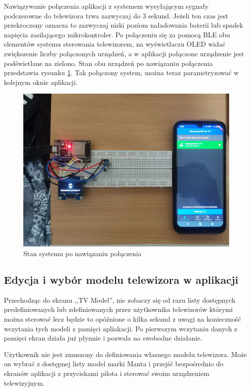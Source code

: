 \documentclass[12pt,twoside]{article}
\begin{document}
Nawiązywanie połączenia aplikacji z systemem wysyłającym sygnały podczerowne do telewizora trwa zazwyczaj do 3 sekund. Jeżeli ten czas jest przekroczony oznacza to zazwyczaj niski poziom naładowania baterii lub spadek napięcia zasilającego mikrokontroler. Po połączeniu się za pomocą BLE obu elementów systemu sterowania telewizorem, na wyświetlaczu OLED widać zwiększenie liczby połączonych urządzeń, a w aplikacji połączone urządzenie jest podświetlane na zielono. Stan obu urządzeń po nawiązaniu połączenia przedstawia rysunku \ref*{Fig:connectingTest}. Tak połączony system, można teraz parametryzować w kolejnym oknie aplikacji.
\begin{figure}[ht]
   \centering
   \includegraphics[width=14cm]{images/connectingTest.jpg}
   \caption{Stan systemu po nawiązaniu połączenia}
   \label{Fig:connectingTest}
\end{figure}

\subsection{Edycja i wybór modelu telewizora w aplikacji}
Przechodząc do ekranu ,,TV Model'', nie zobaczy się od razu listy dostępnych predefiniowanych lub zdefiniowanych przez użytkownika telewizorów którymi można sterować lecz będzie to opóźnione o kilka sekund z uwagi na konieczność wczytania tych modeli z pamięci apliakacji. Po pierwszym wczytaniu danych z pamięci ekran działa już płynnie i pozwala na swobodne działanie.

Użytkownik nie jest zmuszony do definiowania własnego modelu telewizora. Może on wybrać z dostępnej listy model marki Manta i przejść bezpośrednio do ekranów aplikacji z przyciskami pilota i sterować swoim urządzeniem telewizyjnym.
\end{document}
